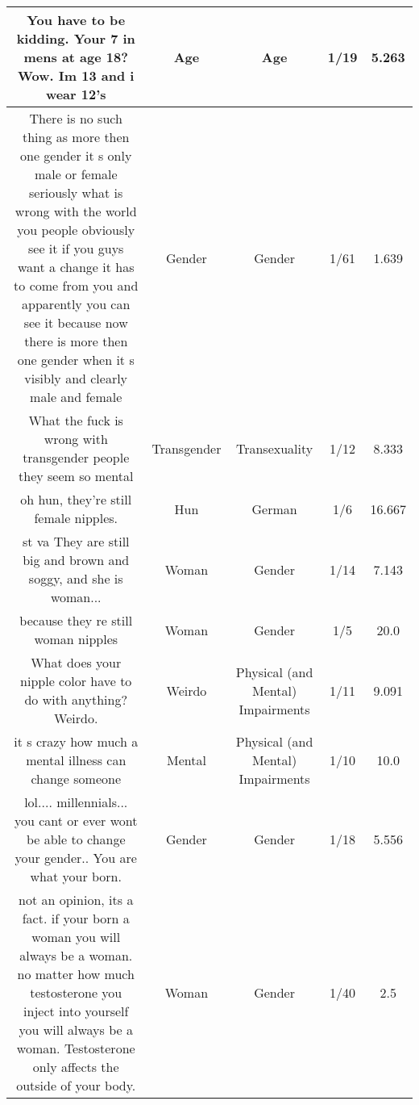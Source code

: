 \documentclass[11pt]{article}
\newlength\mylength
\begin{document}
\begin{center}
\begin{longtable}{|C{.40\mylength}|C{.30\mylength}|C{.15\mylength}|C{.15\mylength}|C{.15\mylength}|}
  You have to be kidding. Your 7 in mens at age 18? Wow. Im 13 and i wear 12's      & Age & Age & 1/19 & 5.263 \\  \hline
  There is no such thing as more then one gender it s only male or female seriously what is wrong with the world you people obviously see it if you guys want a change it has to come from you and apparently you can see it because now there is  more then one gender  when it s visibly and clearly male and female  & Gender & Gender & 1/61 & 1.639 \\  \hline
  What the fuck is wrong with transgender people they seem so mental  & Transgender & Transexuality & 1/12 & 8.333 \\  \hline
  oh hun, they're still female nipples.  & Hun & German & 1/6 & 16.667 \\  \hline
  st va  They are still big and brown and soggy, and she is woman...  & Woman & Gender & 1/14 & 7.143 \\  \hline
  because they re still woman nipples  & Woman & Gender & 1/5 & 20.0 \\  \hline
  What does your nipple color have to do with anything? Weirdo.  & Weirdo & Physical (and Mental) Impairments & 1/11 & 9.091 \\  \hline
  it s crazy how much a mental illness can change someone  & Mental & Physical (and Mental) Impairments & 1/10 & 10.0 \\  \hline
  lol.... millennials... you cant or ever wont be able to change your gender.. You are what your born.  & Gender & Gender & 1/18 & 5.556 \\  \hline
  not an opinion, its a fact. if your born a woman you will always be a woman. no matter how much testosterone you inject into yourself you will always be a woman. Testosterone only affects the outside of your body.  & Woman & Gender & 1/40 & 2.5 \\  \hline

\end{longtable}
\end{center}
\end{document}

